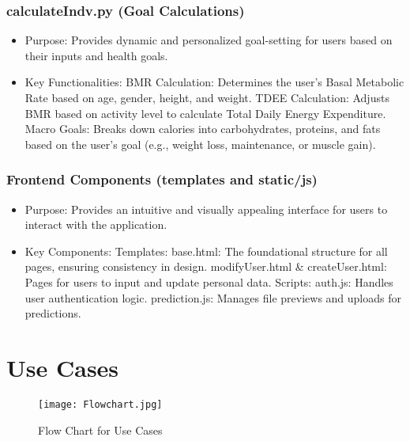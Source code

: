 \documentclass[conference]{IEEEtran}
\begin{document}
\subsubsection{calculateIndv.py (Goal Calculations)}
\begin{itemize}
    \item Purpose: Provides dynamic and personalized goal-setting for users based on their inputs and health goals. \newline
    \item Key Functionalities:\newline
       BMR Calculation: Determines the user's Basal Metabolic Rate based on age, gender, height, and weight.\newline
       TDEE Calculation: Adjusts BMR based on activity level to calculate Total Daily Energy Expenditure.\newline
       Macro Goals: Breaks down calories into carbohydrates, proteins, and fats based on the user's goal (e.g., weight loss, maintenance, or muscle gain).\newline
\end{itemize}
\subsubsection{Frontend Components (templates and static/js)}
\begin{itemize}
    \item Purpose: Provides an intuitive and visually appealing interface for users to interact with the application.\newline
    \item Key Components:\newline
         Templates:\newline
            base.html: The foundational structure for all pages, ensuring consistency in design.\newline
            modifyUser.html & createUser.html: Pages for users to input and update personal data.\newline
         Scripts:\newline
            auth.js: Handles user authentication logic.\newline
            prediction.js: Manages file previews and uploads for predictions.\newline
\end{itemize}
\newpage
\section{Use Cases}
\vspace{12pt}
\begin{figure}[h!]
    \centering
    \texttt{[image: Flowchart.jpg]} 
    \caption{Flow Chart for Use Cases}
    \label{fig:flowchart}
\end{figure}
\end{document}
